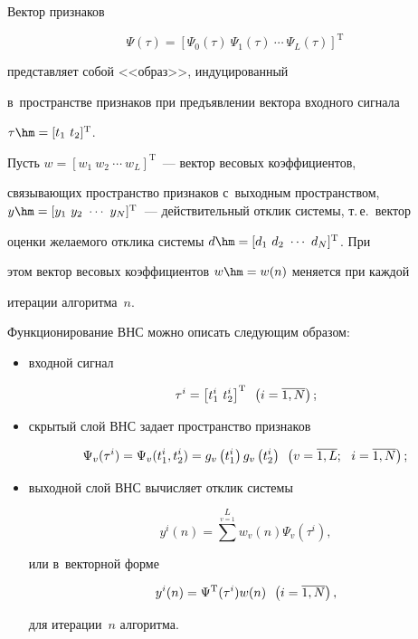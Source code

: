 Вектор признаков 


$$


\Psi(\tau) = \left[ \Psi_0(\tau)\ \Psi_1(\tau)\ \cdots\ 


\Psi_L(\tau)\right]^{\mathrm{T}}


$$


 представляет собой <<образ>>, индуцированный 


в~пространстве признаков при предъявлении вектора входного сигнала 


$\tau\hm= [t_1\ t_2]^{\mathrm{T}}$. 





  Пусть $w=[w_1\ w_2\ \cdots\ w_L]^{\mathrm{T}}$~--- вектор весовых коэффициентов, 


связывающих пространство признаков с~выходным пространством, $y\hm= 


[y_1\ y_2\ \cdots\ y_N]^{\mathrm{T}}$~--- действительный отклик системы, т.\,е.\ вектор 


оценки желаемого отклика системы $d\hm= [d_1\ d_2\ \cdots\ d_N]^{\mathrm{T}}$. При 


этом вектор весовых коэффициентов $w\hm= w(n)$ меняется при каждой 


итерации алгоритма~$n$. 


  


  Функционирование ВНС можно описать следующим образом:


  \begin{itemize}


\item входной сигнал


$$


\tau^i=\left[ t_1^i\ t_2^i\right]^{\mathrm{T}}\enskip \left(i=\overline{1,N}\right);


$$


\item скрытый слой ВНС задает пространство признаков


$$


\Psi_v(\tau^i) = 


\Psi_v(t_1^i, t_2^i)= g_v\left(t_1^i\right) g_v\left(t_2^i\right)\enskip \left(v= \overline{1,L};\ \ i= \overline{1,N}\right);


$$


\item выходной слой ВНС вычисляет отклик системы


$$


y^i(n)= 


\sum^L\limits_{v=1} w_v(n) \Psi_v(\tau^i),


$$


 или в~векторной форме 


 $$


 y^i(n)= 


\Psi^{\mathrm{T}}(\tau^i) w(n)\enskip \left(i= \overline{1,N}\right),


$$


 для итерации~$n$ алгоритма.


\end{itemize}





